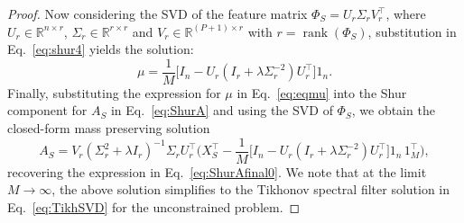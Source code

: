 \documentclass[10pt,a4paper]{amsart}
\begin{document}
\begin{proof}
Now considering the SVD of the feature matrix $\Phi_S=U_r\Sigma_r V^{\top}_r$, where $U_r \in \mathbb{R}^{n\times r}$, $\Sigma_r\in \mathbb{R}^{r \times r}$ and $V_r \in \mathbb{R}^{(P+1)\times r}$ with $r=\operatorname{rank}(\Phi_S)$, substitution in Eq.~\eqref{eq:shur4} yields the solution:
\begin{equation}
    \mu =\frac{1}{M}\big[I_n-U_r(I_r + \lambda \Sigma_r^{-2})U_r^{\top}\big]1_n.
    \label{eq:eqmu}
\end{equation}
Finally, substituting the expression for $\mu$ in Eq.~\eqref{eq:eqmu} into the Shur component for $A_S$ in Eq.~\eqref{eq:ShurA} and using the SVD of $\Phi_S$, we obtain the closed-form mass preserving solution
\begin{equation}
A_S=V_r(\Sigma^2_r+\lambda I_r)^{-1}\Sigma_r U^{\top}_r\big(X^{\top}_S-\frac{1}{M}\big[I_n-U_r(I_r + \lambda \Sigma^{-2}_r)U^{\top}_r\big]1_n\,1_M^\top\big),
    \label{eq:ShurAfinal}
\end{equation}
recovering the expression in Eq.~\eqref{eq:ShurAfinal0}. We note that at the limit $M\to \infty$, the above solution simplifies to the Tikhonov spectral filter solution in Eq.~\eqref{eq:TikhSVD} for the unconstrained problem.


\end{proof}
\end{document}
